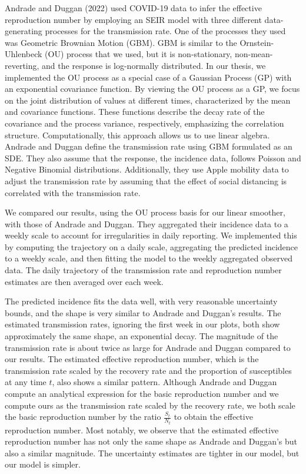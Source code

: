 \documentclass[
11pt, %
oneside, %
english, %
singlespacing, %
]{macthesis} %
\begin{document}
Andrade and Duggan (2022) used COVID-19 data to infer the effective reproduction number by employing an SEIR model with three different data-generating processes for the transmission rate. One of the processes they used was Geometric Brownian Motion (GBM). GBM is similar to the Ornstein-Uhlenbeck (OU) process that we used, but it is non-stationary, non-mean-reverting, and the response is log-normally distributed. In our thesis, we implemented the OU process as a special case of a Gaussian Process (GP) with an exponential covariance function. By viewing the OU process as a GP, we focus on the joint distribution of values at different times, characterized by the mean and covariance functions. These functions describe the decay rate of the covariance and the process variance, respectively, emphasizing the correlation structure. Computationally, this approach allows us to use linear algebra. Andrade and Duggan define the transmission rate using GBM formulated as an SDE. They also assume that the response, the incidence data, follows Poisson and Negative Binomial distributions. Additionally, they use Apple mobility data to adjust the transmission rate by assuming that the effect of social distancing is correlated with the transmission rate.

We compared our results, using the OU process basis for our linear smoother, with those of Andrade and Duggan. They aggregated their incidence data to a weekly scale to account for irregularities in daily reporting. We implemented this by computing the trajectory on a daily scale, aggregating the predicted incidence to a weekly scale, and then fitting the model to the weekly aggregated observed data. The daily trajectory of the transmission rate and reproduction number estimates are then averaged over each week.

The predicted incidence fits the data well, with very reasonable uncertainty bounds, and the shape is very similar to Andrade and Duggan's results. The estimated transmission rates, ignoring the first week in our plots, both show approximately the same shape, an exponential decay. The magnitude of the transmission rate is about twice as large for Andrade and Duggan compared to our results. The estimated effective reproduction number, which is the transmission rate scaled by the recovery rate and the proportion of susceptibles at any time \(t\), also shows a similar pattern. Although Andrade and Duggan compute an analytical expression for the basic reproduction number and we compute ours as the transmission rate scaled by the recovery rate, we both scale the basic reproduction number by the ratio \(\frac{S_t}{N_t}\) to obtain the effective reproduction number. Most notably, we observe that the estimated effective reproduction number has not only the same shape as Andrade and Duggan's but also a similar magnitude. The uncertainty estimates are tighter in our model, but our model is simpler.
\end{document}
